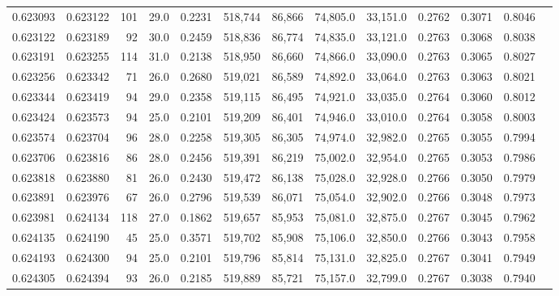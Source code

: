 \begin{tabular}{rrrrrrrrrrrrr}
0.623093 & 0.623122 &   101 & 29.0 &                                     0.2231 & 518,744 &  86,866 &  74,805.0 &  33,151.0 & 0.2762 & 0.3071 & 0.8046 \\
0.623122 & 0.623189 &    92 & 30.0 &                                     0.2459 & 518,836 &  86,774 &  74,835.0 &  33,121.0 & 0.2763 & 0.3068 & 0.8038 \\
0.623191 & 0.623255 &   114 & 31.0 &                                     0.2138 & 518,950 &  86,660 &  74,866.0 &  33,090.0 & 0.2763 & 0.3065 & 0.8027 \\
0.623256 & 0.623342 &    71 & 26.0 &                                     0.2680 & 519,021 &  86,589 &  74,892.0 &  33,064.0 & 0.2763 & 0.3063 & 0.8021 \\
0.623344 & 0.623419 &    94 & 29.0 &                                     0.2358 & 519,115 &  86,495 &  74,921.0 &  33,035.0 & 0.2764 & 0.3060 & 0.8012 \\
0.623424 & 0.623573 &    94 & 25.0 &                                     0.2101 & 519,209 &  86,401 &  74,946.0 &  33,010.0 & 0.2764 & 0.3058 & 0.8003 \\
0.623574 & 0.623704 &    96 & 28.0 &                                     0.2258 & 519,305 &  86,305 &  74,974.0 &  32,982.0 & 0.2765 & 0.3055 & 0.7994 \\
0.623706 & 0.623816 &    86 & 28.0 &                                     0.2456 & 519,391 &  86,219 &  75,002.0 &  32,954.0 & 0.2765 & 0.3053 & 0.7986 \\
0.623818 & 0.623880 &    81 & 26.0 &                                     0.2430 & 519,472 &  86,138 &  75,028.0 &  32,928.0 & 0.2766 & 0.3050 & 0.7979 \\
0.623891 & 0.623976 &    67 & 26.0 &                                     0.2796 & 519,539 &  86,071 &  75,054.0 &  32,902.0 & 0.2766 & 0.3048 & 0.7973 \\
0.623981 & 0.624134 &   118 & 27.0 &                                     0.1862 & 519,657 &  85,953 &  75,081.0 &  32,875.0 & 0.2767 & 0.3045 & 0.7962 \\
0.624135 & 0.624190 &    45 & 25.0 &                                     0.3571 & 519,702 &  85,908 &  75,106.0 &  32,850.0 & 0.2766 & 0.3043 & 0.7958 \\
0.624193 & 0.624300 &    94 & 25.0 &                                     0.2101 & 519,796 &  85,814 &  75,131.0 &  32,825.0 & 0.2767 & 0.3041 & 0.7949 \\
0.624305 & 0.624394 &    93 & 26.0 &                                     0.2185 & 519,889 &  85,721 &  75,157.0 &  32,799.0 & 0.2767 & 0.3038 & 0.7940 \\

\end{tabular}
